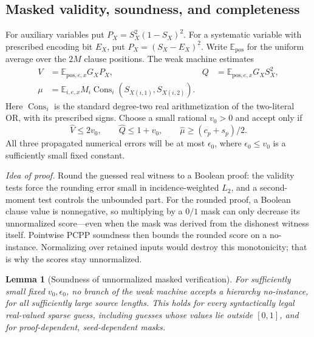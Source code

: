 \documentclass[11pt,letterpaper]{article}
\newtheorem{lemma}[theorem]{Lemma}
\theoremstyle{definition}
\theoremstyle{remark}
\begin{document}
\subsection{Masked validity, soundness, and completeness}
\label{tr:verification}

For auxiliary variables put $P_X=S_X^2(1-S_X)^2$.
For a systematic variable with prescribed encoding bit $E_X$, put
$P_X=(S_X-E_X)^2$. Write $\mathbb E_{\mathrm{pos}}$ for the uniform
average over the $2M$ clause positions. The weak machine estimates
\begin{align}
 V&=\mathbb E_{\mathrm{pos},e,x}G_XP_X,&
 Q&=\mathbb E_{\mathrm{pos},e,x}G_XS_X^2,\\
 \mu&=\mathbb E_{i,e,x}M_i
       \operatorname{Cons}_i(S_{X(i,1)},S_{X(i,2)}).
 \label{tr:tests}
\end{align}
Here $\operatorname{Cons}_i$ is the standard degree-two real
arithmetization of the two-literal OR, with its prescribed signs.
Choose a small rational $v_0>0$ and accept only if
\begin{equation}
 \widehat V\le2v_0,\qquad \widehat Q\le1+v_0,
 \qquad \widehat\mu\ge(c_p+s_p)/2.
 \label{tr:thresholds}
\end{equation}
All three propagated numerical errors will be at most $\epsilon_0$,
where $\epsilon_0\le v_0$ is a sufficiently small fixed constant.

\emph{Idea of proof.} Round the guessed real witness to a Boolean
proof: the validity tests force the rounding error small in
incidence-weighted $L_2$, and a second-moment test controls the
unbounded part. For the rounded proof, a Boolean clause value is
nonnegative, so multiplying by a $0/1$ mask can only decrease its
unnormalized score---even when the mask was derived from the
dishonest witness itself. Pointwise PCPP soundness then bounds the
rounded score on a no-instance. Normalizing over retained inputs
would destroy this monotonicity; that is why the scores stay
unnormalized.

\begin{lemma}[Soundness of unnormalized masked verification]
\label{tr:soundness}
For sufficiently small fixed $v_0,\epsilon_0$, no branch of the weak
machine accepts a hierarchy no-instance, for all sufficiently large
source lengths. This holds for every syntactically legal real-valued
sparse guess, including guesses whose values lie outside $[0,1]$,
and for proof-dependent, seed-dependent masks.
\end{lemma}
\end{document}
